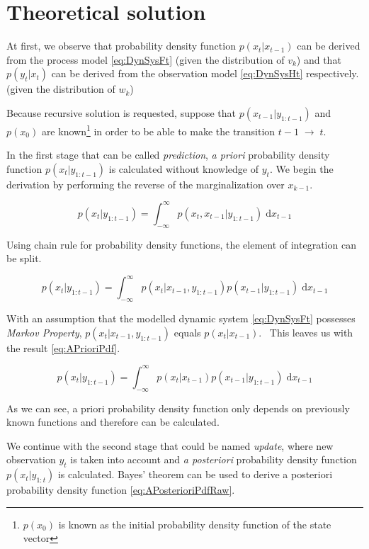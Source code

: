 \documentclass[a4paper,12pt,oneside]{report}
\newcommand{\pdf}{probability density function}
\newcommand{\pdfs}{probability density functions}
\begin{document}
\section{Theoretical solution}

At first, we observe that {\pdf} \(p(x_t|x_{t-1})\) can be derived from the process model
\eqref{eq:DynSysFt} (given the distribution of \(v_k\)) and that \(p(y_t|x_t)\) can be derived from
the observation model \eqref{eq:DynSysHt} respectively. (given the distribution of \(w_k\))

Because recursive solution is requested, suppose that \(p(x_{t-1}|y_{1:t-1})\) and
\(p(x_0)\) are known\footnote{\(p(x_0)\) is known as the initial {\pdf} of the state vector} in
order to be able to make the transition \(t-1 \; \rightarrow \; t\).

In the first stage that can be called \emph{prediction}, \emph{a priori} {\pdf}
\(p(x_t | y_{1:t-1})\) is calculated without knowledge of \(y_t\). We begin the derivation by
performing the reverse of the marginalization over \(x_{k-1}\).

\begin{equation*}
	p(x_t | y_{1:t-1}) = \int_{-\infty}^{\infty} p(x_t, x_{t-1} | y_{1:t-1}) \; \mathrm{d} x_{t-1}
\end{equation*}

Using chain rule for {\pdfs}, the element of integration can be split.

\begin{equation*}
	p(x_t | y_{1:t-1}) = \int_{-\infty}^{\infty} p(x_t | x_{t-1}, y_{1:t-1}) p(x_{t-1} | y_{1:t-1}) \; \mathrm{d} x_{t-1}
\end{equation*}

With an assumption that the modelled dynamic system \eqref{eq:DynSysFt} possesses
\emph{Markov Property}, \(p(x_t | x_{t-1}, y_{1:t-1})\) equals \(p(x_t | x_{t-1})\).~\cite{AruMasGor:02}
This leaves us with the result \eqref{eq:APrioriPdf}.

\begin{equation} \label{eq:APrioriPdf}
	p(x_t | y_{1:t-1}) = \int_{-\infty}^{\infty} p(x_t | x_{t-1}) p(x_{t-1} | y_{1:t-1}) \; \mathrm{d} x_{t-1}
\end{equation}

As we can see, a priori {\pdf} only depends on previously known functions and therefore can be
calculated.

We continue with the second stage that could be named \emph{update}, where new observation \(y_t\) is taken into
account and \emph{a posteriori} {\pdf} \(p(x_t | y_{1:t})\) is calculated. Bayes' theorem can be used
to derive a posteriori {\pdf} \eqref{eq:APosterioriPdfRaw}.
\end{document}
